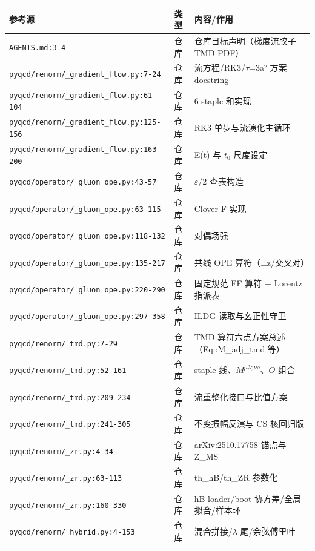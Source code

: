 \documentclass[UTF8]{ctexart}
\begin{document}
\begin{xltabular}{\textwidth}{XlX}
\toprule
\textcolor{evidence}{参考源} & 类型 & 内容/作用 \\
\midrule
\endhead
\texttt{\nolinkurl{AGENTS.md:3-4}} & 仓库 & 仓库目标声明（梯度流胶子 TMD-PDF） \\
\texttt{\nolinkurl{pyqcd/renorm/_gradient_flow.py:7-24}} & 仓库 & 流方程/RK3/$\tau$=3a² 方案 docstring \\
\texttt{\nolinkurl{pyqcd/renorm/_gradient_flow.py:61-104}} & 仓库 & 6-staple 和实现 \\
\texttt{\nolinkurl{pyqcd/renorm/_gradient_flow.py:125-156}} & 仓库 & RK3 单步与流演化主循环 \\
\texttt{\nolinkurl{pyqcd/renorm/_gradient_flow.py:163-200}} & 仓库 & E(t) 与 $t_0$ 尺度设定 \\
\texttt{\nolinkurl{pyqcd/operator/_gluon_ope.py:43-57}} & 仓库 & $\varepsilon$/2 查表构造 \\
\texttt{\nolinkurl{pyqcd/operator/_gluon_ope.py:63-115}} & 仓库 & Clover F 实现 \\
\texttt{\nolinkurl{pyqcd/operator/_gluon_ope.py:118-132}} & 仓库 & 对偶场强 \\
\texttt{\nolinkurl{pyqcd/operator/_gluon_ope.py:135-217}} & 仓库 & 共线 OPE 算符（±z/交叉对） \\
\texttt{\nolinkurl{pyqcd/operator/_gluon_ope.py:220-290}} & 仓库 & 固定规范 FF 算符 + Lorentz 指派表 \\
\texttt{\nolinkurl{pyqcd/operator/_gluon_ope.py:297-358}} & 仓库 & ILDG 读取与幺正性守卫 \\
\texttt{\nolinkurl{pyqcd/renorm/_tmd.py:7-29}} & 仓库 & TMD 算符六点方案总述（Eq.:M\_adj\_tmd 等） \\
\texttt{\nolinkurl{pyqcd/renorm/_tmd.py:52-161}} & 仓库 & staple 线、$M^{\mu\lambda;\nu\rho}$、$O$ 组合 \\
\texttt{\nolinkurl{pyqcd/renorm/_tmd.py:209-234}} & 仓库 & 流重整化接口与比值方案 \\
\texttt{\nolinkurl{pyqcd/renorm/_tmd.py:241-305}} & 仓库 & 不变振幅反演与 CS 核回归版 \\
\texttt{\nolinkurl{pyqcd/renorm/_zr.py:4-34}} & 仓库 & arXiv:2510.17758 锚点与 Z\_MS \\
\texttt{\nolinkurl{pyqcd/renorm/_zr.py:63-113}} & 仓库 & th\_hB/th\_ZR 参数化 \\
\texttt{\nolinkurl{pyqcd/renorm/_zr.py:160-330}} & 仓库 & hB loader/boot 协方差/全局拟合/样本环 \\
\texttt{\nolinkurl{pyqcd/renorm/_hybrid.py:4-153}} & 仓库 & 混合拼接/$\lambda$ 尾/余弦傅里叶 \\

\end{xltabular}
\end{document}

